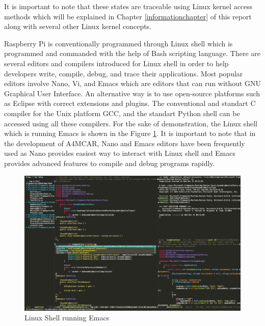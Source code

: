It is important to note that these states are traceable using Linux kernel access methods which will be explained in Chapter \ref{informationchapter} of this report along with several other Linux kernel concepts.

Raspberry Pi is conventionally programmed through Linux shell which is programmed and commanded with the help of Bash scripting language. There are several editors and compilers introduced for Linux shell in order to help developers write, compile, debug, and trace their applications. Most popular editors involve Nano, Vi, and Emacs which are editors that can run without GNU Graphical User Interface. An alternative way is to use open-source platforms such as Eclipse with correct extensions and plugins. The conventional and standart C compiler for the Unix platform GCC, and the standart Python shell can be accessed using all these compilers. For the sake of demonstration, the Linux shell which is running Emacs is shown in the Figure \ref{fig:linuxeditors}. It is important to note that in the development of A4MCAR, Nano and Emacs editors have been frequently used as Nano provides easiest way to interact with Linux shell and Emacs provides advanced features to compile and debug programs rapidly.
\begin{figure}[!ht]
	\centering
	\captionsetup{justification=centering}
	\includegraphics[width=\textwidth]{content/images/linuxeditors.png}
	\caption{Linux Shell running Emacs}
	\label{fig:linuxeditors}
\end{figure}
